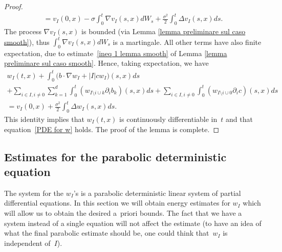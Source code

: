\documentclass[a4paper,10pt]{article}
\newcommand\1{\mathbbm{1}}
\numberwithin{equation}{section}
\begin{document}
\begin{proof}
\begin{multline*}
 =v_{I}(0,x)  -\sigma\int_{0}^{t}\nabla v_{I}(
s,x)  dW_{s}+\frac{\sigma^{2}}{2}\int_{0}^{t}\Delta v_{I}(
s,x)  ds .
\end{multline*}
The process $\nabla v_{I}(s,x)$ is bounded (via Lemma
\ref{lemma preliminare sul caso smooth}), thus $\int_{0}^{t}\nabla
v_{I}(s,x)  dW_{s}$ is a martingale. All other terms have also
finite expectation, due to estimate~\eqref{ineq 1 lemma smooth} of Lemma
\ref{lemma preliminare sul caso smooth}. Hence, taking expectation, we have
\begin{multline*}
w_{I}(t,x)  +\int_{0}^{t}  \big(b\cdot\nabla w_{I}+\left\vert
I\right\vert cw_{I} \big)  (s,x)  ds\\
+\sum_{i\in I,i\neq0}\sum_{k=1}^{d}\int_{0}^{t}(w_{I\setminus i\cup
k}\partial_{i}b_{k})  (s,x)  ds+\sum_{i\in I,i\neq0} 
\int_{0}^{t}(w_{I\setminus i\cup0}\partial_{i}c)  (
s,x)  ds\\
=v_{I}(0,x)  +\frac{\sigma^{2}}{2}\int_{0}^{t}\Delta
w_{I}(s,x)  ds .
\end{multline*}
This identity implies that $w_{I}(t,x)$ is continuously differentiable in~$t$ and that equation~\eqref{PDE for w} holds. The proof of the lemma is complete.
\end{proof}


\subsection{Estimates for the parabolic deterministic equation}
\label{section_parabolic_estimates}

The system for the $w_I$'s is a parabolic deterministic linear system of partial differential equations. In this section we will obtain energy estimates for $w_I$ which will allow us to obtain the desired a~priori bounds. The fact that we have a system instead of a single equation will not affect the estimate (to have an idea of what the final parabolic estimate should be, one could think that~$w_I$ is independent of~$I$).
 
\end{document}
